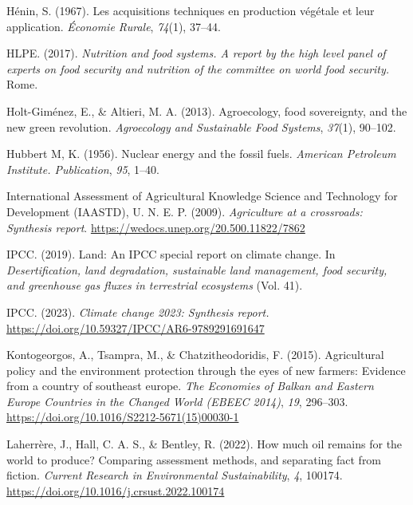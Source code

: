 \documentclass[a4paper, nobind]{templates/ociamthesis}
\newlength{\cslhangindent}
\newenvironment{CSLReferences}[2] %
 {%
  \setlength{\parindent}{0pt}
  \ifodd #1
  \let\oldpar\par
  \def\par{\hangindent=\cslhangindent\oldpar}
  \fi
  \setlength{\parskip}{1mm}
  \setlength{\baselineskip}{6mm}
 }%
 {}
\begin{document}
\begin{CSLReferences}{1}{0}
\leavevmode{}%
Hénin, S. (1967). Les acquisitions techniques en production v{é}g{é}tale et leur application. \emph{{É}conomie Rurale}, \emph{74}(1), 37--44.

\leavevmode{}%
HLPE. (2017). \emph{Nutrition and food systems. A report by the high level panel of experts on food security and nutrition of the committee on world food security.} Rome.

\leavevmode{}%
Holt-Giménez, E., \& Altieri, M. A. (2013). Agroecology, food sovereignty, and the new green revolution. \emph{Agroecology and Sustainable Food Systems}, \emph{37}(1), 90--102.

\leavevmode{}%
Hubbert M, K. (1956). Nuclear energy and the fossil fuels. \emph{American Petroleum Institute. Publication}, \emph{95}, 1--40.

\leavevmode{}%
International Assessment of Agricultural Knowledge Science and Technology for Development (IAASTD), U. N. E. P. (2009). \emph{Agriculture at a crossroads: Synthesis report}. \url{https://wedocs.unep.org/20.500.11822/7862}

\leavevmode{}%
IPCC. (2019). Land: An IPCC special report on climate change. In \emph{Desertification, land degradation, sustainable land management, food security, and greenhouse gas fluxes in terrestrial ecosystems} (Vol. 41).

\leavevmode{}%
IPCC. (2023). \emph{Climate change 2023: Synthesis report.} \url{https://doi.org/10.59327/IPCC/AR6-9789291691647}

\leavevmode{}%
Kontogeorgos, A., Tsampra, M., \& Chatzitheodoridis, F. (2015). Agricultural policy and the environment protection through the eyes of new farmers: Evidence from a country of southeast europe. \emph{The Economies of Balkan and Eastern Europe Countries in the Changed World (EBEEC 2014)}, \emph{19}, 296--303. \url{https://doi.org/10.1016/S2212-5671(15)00030-1}

\leavevmode{}%
Laherrère, J., Hall, C. A. S., \& Bentley, R. (2022). How much oil remains for the world to produce? Comparing assessment methods, and separating fact from fiction. \emph{Current Research in Environmental Sustainability}, \emph{4}, 100174. \url{https://doi.org/10.1016/j.crsust.2022.100174}


\end{CSLReferences}
\end{document}
